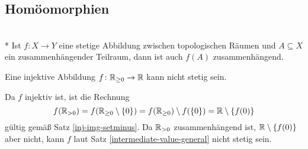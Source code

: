\subsection{Homöomorphien}
\begin{Satz}%
\label{intermediate-value-general}\mbox{}\\*
Ist $f\colon X\to Y$ eine stetige Abbildung zwischen topologischen
Räumen und $A\subseteq X$ ein zusammenhängender Teilraum,
dann ist auch $f(A)$ zusammenhängend.
\end{Satz}

\begin{Satz}
Eine injektive Abbildung $f\colon\mathbb R_{\ge 0}\to\mathbb R$ kann nicht stetig sein.
\end{Satz}
\begin{Beweis}
Da $f$ injektiv ist, ist die Rechnung
\[f(\mathbb R_{>0}) = f(\mathbb R_{\ge 0}\setminus\{0\})
= f(\mathbb R_{\ge 0})\setminus f(\{0\}) = \mathbb R\setminus\{f(0)\}\]
gültig gemäß Satz \ref{inj-img-setminus}. Da $\mathbb R_{>0}$ zusammenhängend
ist, $\mathbb R\setminus\{f(0)\}$ aber nicht, kann $f$ laut Satz
\ref{intermediate-value-general} nicht stetig sein.\;\qedsymbol
\end{Beweis}
